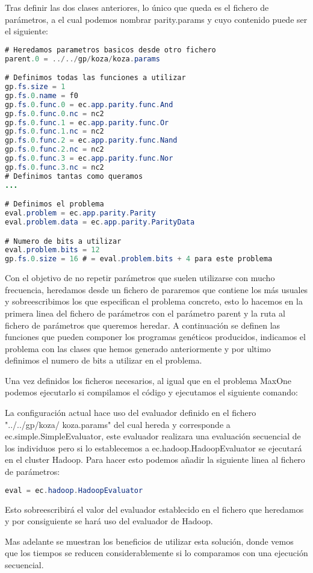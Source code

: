 Tras definir las dos clases anteriores, lo único que queda es el fichero de parámetros, a el cual podemos nombrar parity.params y cuyo contenido puede ser el siguiente:

\begin{lstlisting}[language=Java]
# Heredamos parametros basicos desde otro fichero
parent.0 = ../../gp/koza/koza.params

# Definimos todas las funciones a utilizar
gp.fs.size = 1
gp.fs.0.name = f0
gp.fs.0.func.0 = ec.app.parity.func.And
gp.fs.0.func.0.nc = nc2
gp.fs.0.func.1 = ec.app.parity.func.Or
gp.fs.0.func.1.nc = nc2
gp.fs.0.func.2 = ec.app.parity.func.Nand
gp.fs.0.func.2.nc = nc2
gp.fs.0.func.3 = ec.app.parity.func.Nor
gp.fs.0.func.3.nc = nc2
# Definimos tantas como queramos
...

# Definimos el problema
eval.problem = ec.app.parity.Parity
eval.problem.data = ec.app.parity.ParityData

# Numero de bits a utilizar
eval.problem.bits = 12
gp.fs.0.size = 16 # = eval.problem.bits + 4 para este problema
\end{lstlisting}

Con el objetivo de no repetir parámetros que suelen utilizarse con mucho frecuencia, heredamos desde un fichero de pararemos que contiene los m\'as usuales y sobreescribimos los que especifican el problema concreto, esto lo hacemos en la primera linea del fichero de parámetros con el parámetro parent y la ruta al fichero de parámetros que queremos heredar. A continuación se definen las funciones que pueden componer los programas genéticos producidos, indicamos el problema con las clases que hemos generado anteriormente y por ultimo definimos el numero de bits a utilizar en el problema.

Una vez definidos los ficheros necesarios, al igual que en el problema MaxOne podemos ejecutarlo si compilamos el código y ejecutamos el siguiente comando:


La configuración actual hace uso del evaluador definido en el fichero "../../gp/koza/ koza.params" del cual hereda y corresponde a ec.simple.SimpleEvaluator, este evaluador realizara una evaluación secuencial de los individuos pero si lo establecemos a ec.hadoop.HadoopEvaluator se ejecutar\'a en el cluster Hadoop. Para hacer esto podemos a\~nadir la siguiente linea al fichero de parámetros:

\begin{lstlisting}[language=Java]
eval = ec.hadoop.HadoopEvaluator
\end{lstlisting}

Esto sobreescribir\'a el valor del evaluador establecido en el fichero que heredamos y por consiguiente se hará uso del evaluador de Hadoop.

Mas adelante  se muestran los beneficios de utilizar esta solución, donde vemos que los tiempos se reducen considerablemente si lo comparamos con una ejecución secuencial.